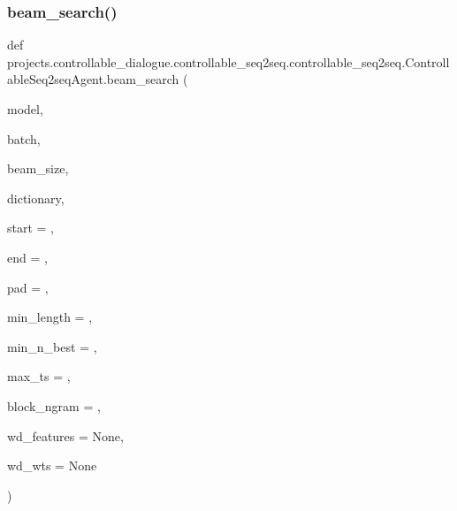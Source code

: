 \subsubsection{\texorpdfstring{beam\+\_\+search()}{beam\_search()}}
{\footnotesize\ttfamily def projects.\+controllable\+\_\+dialogue.\+controllable\+\_\+seq2seq.\+controllable\+\_\+seq2seq.\+Controllable\+Seq2seq\+Agent.\+beam\+\_\+search (\begin{DoxyParamCaption}\item[{}]{model,  }\item[{}]{batch,  }\item[{}]{beam\+\_\+size,  }\item[{}]{dictionary,  }\item[{}]{start = {},  }\item[{}]{end = {},  }\item[{}]{pad = {},  }\item[{}]{min\+\_\+length = {},  }\item[{}]{min\+\_\+n\+\_\+best = {},  }\item[{}]{max\+\_\+ts = {},  }\item[{}]{block\+\_\+ngram = {},  }\item[{}]{wd\+\_\+features = {\ttfamily None},  }\item[{}]{wd\+\_\+wts = {\ttfamily None} }\end{DoxyParamCaption})\hspace{0.3cm}{\ttfamily [static]}}

